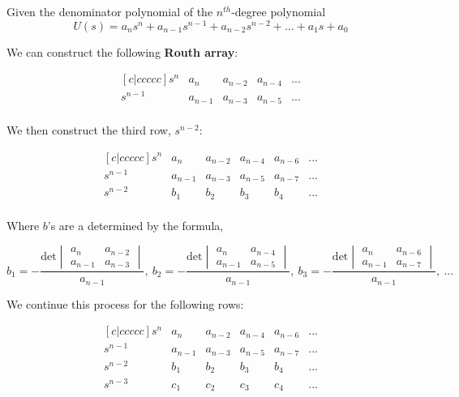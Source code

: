 \documentclass{report}
\begin{document}
\noindent Given the denominator polynomial of the $n^{th}$-degree polynomial
$$U(s)=a_{n}s^{n}+a_{n-1}s^{n-1}+a_{n-2}s^{n-2}+...+a_{1}s+a_{0}$$

\noindent We can construct the following \textbf{Routh array}:

$$
\begin{matrix}[c|ccccc]
    s^{n} & a_{n} & a_{n-2} & a_{n-4} &  ...\\
    s^{n-1} & a_{n-1} & a_{n-3} & a_{n-5} &  ... \\ 
\end{matrix}
$$


\noindent We then construct the third row, $s^{n-2}$:

$$
\begin{matrix}[c|ccccc]
    s^{n} & a_{n} & a_{n-2} & a_{n-4} & a_{n-6} & ...\\
    s^{n-1} & a_{n-1} & a_{n-3} & a_{n-5} & a_{n-7} & ... \\ 
    s^{n-2} & b_{1} & b_{2} & b_{3} & b_{4} & ... \\ 
\end{matrix}
$$

\noindent Where $b$'s are a determined by the formula,

$$b_{1}=-\frac{\text{det}
\begin{vmatrix}
    a_{n} & a_{n-2} \\
    a_{n-1} & a_{n-3}
\end{vmatrix}}{a_{n-1}}
,\ 
b_{2}=-\frac{\text{det}
\begin{vmatrix}
    a_{n} & a_{n-4} \\
    a_{n-1} & a_{n-5}
\end{vmatrix}}{a_{n-1}}
,\ 
b_{3}=-\frac{\text{det}
\begin{vmatrix}
    a_{n} & a_{n-6} \\
    a_{n-1} & a_{n-7}
\end{vmatrix}}{a_{n-1}}
,\ ...
$$

\noindent We continue this process for the following rows:

$$
\begin{matrix}[c|ccccc]
    s^{n} & a_{n} & a_{n-2} & a_{n-4} & a_{n-6} & ...\\
    s^{n-1} & a_{n-1} & a_{n-3} & a_{n-5} & a_{n-7} & ... \\ 
    s^{n-2} & b_{1} & b_{2} & b_{3} & b_{4} & ... \\ 
    s^{n-3} & c_{1} & c_{2} & c_{3} & c_{4} & ... \\ 
\end{matrix}
$$
\end{document}
